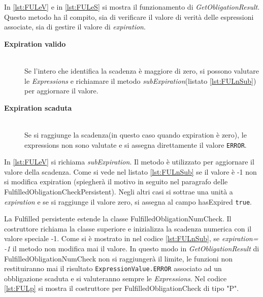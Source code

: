 In \ref{lst:FULeV} e in \ref{lst:FULeS} si mostra il funzionamento di \emph{GetObligationResult}.
Questo metodo ha il compito, sia di verificare il valore di
verità delle espressioni associate, sia di gestire il valore di \emph{expiration}.
\begin{description}
  \item[\normalfont\bfseries{\MakeUppercase{E}xpiration valido}]
  {
  \hfill \\
  Se l'intero che identifica la scadenza è maggiore di zero,
  si possono valutare le \emph{Expressions} e richiamare il metodo \emph{subExpiration}(listato \ref{lst:FULnSub})
  per aggiornare il valore.
  }
  \item[\normalfont\bfseries{\MakeUppercase{E}xpiration scaduta}]
  {
  \hfill \\
  Se si raggiunge la scadenza(in questo caso quando expiration è zero), le expressions non sono valutate
  e si assegna direttamente il valore \texttt{ERROR}.
  }
\end{description}
In \ref{lst:FULeV} si richiama \emph{subExpiration}. Il metodo è utilizzato per aggiornare il
valore della scadenza. Come si vede nel listato \ref{lst:FULnSub} se il valore è -1 non si modifica expiration
(spiegherà il motivo in seguito nel paragrafo delle FulfilledObligationCheckPersistent).
Negli altri casi si sottrae una unità a \emph{expiration} e
se si raggiunge il valore zero, si assegna al campo hasExpired \texttt{true}.

La Fulfilled persistente estende la classe FulfilledObligationNumCheck.
Il costruttore richiama la classe superiore e inizializza la scadenza numerica con
il valore speciale -1. Come si è mostrato in nel codice \ref{lst:FULnSub}, se \emph{expiration= -1}
il metodo non modifica mai il valore. In questo modo in \emph{GetObligationResult} di
FulfilledObligationNumCheck non si raggiungerà
il limite, le funzioni non restituiranno mai il risultato \texttt{ExpressionValue.ERROR} associato
ad un obbligazione scaduta e si valuteranno sempre le \emph{Expressions}.
Nel codice \ref{lst:FULp} si mostra il costruttore per FulfilledObligationCheck di tipo "P".

